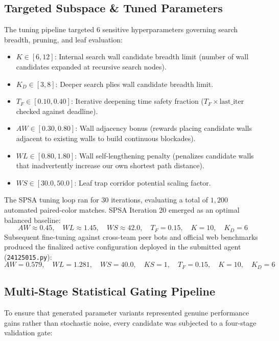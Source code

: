 \subsection{Targeted Subspace \& Tuned Parameters}
The tuning pipeline targeted 6 sensitive hyperparameters governing search breadth, pruning, and leaf evaluation:
\begin{itemize}[leftmargin=1.5em]
    \item $K \in [6, 12]$: Internal search wall candidate breadth limit (number of wall candidates expanded at recursive search nodes).
    \item $K_D \in [3, 8]$: Deeper search plies wall candidate breadth limit.
    \item $T_F \in [0.10, 0.40]$: Iterative deepening time safety fraction ($T_F \times \text{last\_iter}$ checked against deadline).
    \item $AW \in [0.30, 0.80]$: Wall adjacency bonus (rewards placing candidate walls adjacent to existing walls to build continuous blockades).
    \item $WL \in [0.80, 1.80]$: Wall self-lengthening penalty (penalizes candidate walls that inadvertently increase our own shortest path distance).
    \item $WS \in [30.0, 50.0]$: Leaf trap corridor potential scaling factor.
\end{itemize}

The SPSA tuning loop ran for $30$ iterations, evaluating a total of $1,200$ automated paired-color matches. SPSA Iteration 20 emerged as an optimal balanced baseline:
\begin{equation}
    AW \approx 0.45, \quad WL \approx 1.45, \quad WS \approx 42.0, \quad T_F = 0.15, \quad K = 10, \quad K_D = 6
\end{equation}
Subsequent fine-tuning against cross-team peer bots and official web benchmarks produced the finalized active configuration deployed in the submitted agent (\texttt{24125015.py}):
\begin{equation}
    AW = 0.579, \quad WL = 1.281, \quad WS = 40.0, \quad KS = 1, \quad T_F = 0.15, \quad K = 10, \quad K_D = 6
\end{equation}

\subsection{Multi-Stage Statistical Gating Pipeline}
To ensure that generated parameter variants represented genuine performance gains rather than stochastic noise, every candidate was subjected to a four-stage validation gate:

